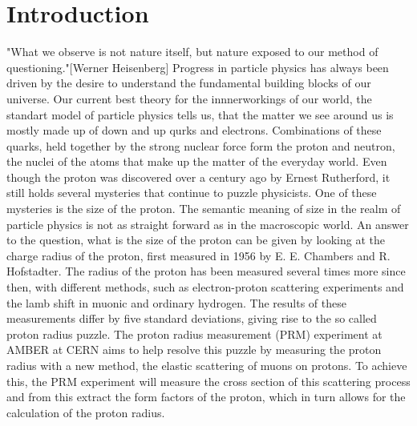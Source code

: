 \chapter{Introduction} \label{chap:introduction}
"What we observe is not nature itself, but nature exposed to our method of questioning."[Werner Heisenberg]\autocite{Heisenberg1958}
\newline
Progress in particle physics has always been driven by the desire to understand the fundamental building blocks of our universe.
\newline Our current best theory for the innnerworkings of our world,
the standart model of particle physics tells us, that the matter we see around us is mostly made up of down and up qurks and electrons.
Combinations of these quarks, held together by the strong nuclear force form the proton and neutron, the nuclei of the atoms that make up the matter of the everyday world.\autocite{Workman:2836514}
Even though the proton was discovered over a century ago by Ernest Rutherford\autocite{discoveryProton}, it still holds several mysteries that continue to puzzle physicists.
One of these mysteries is the size of the proton.
\newline
The semantic meaning of size in the realm of particle physics is not as straight forward as in the macroscopic world. An answer to the question,
what is the size of the proton can be given by looking at the charge radius of the proton, first measured in 1956 by E. E. Chambers and R. Hofstadter.\autocite{Hofstadter1956}
\newline
The radius of the proton has been measured several times more since then, with different methods, such as electron-proton scattering experiments and the lamb shift in muonic and ordinary hydrogen.
The results of these measurements differ by five standard deviations, giving rise to the so called proton radius puzzle.\autocite{ProposalAmber}
\newline
The proton radius measurement (PRM) experiment at AMBER at CERN aims to help resolve this puzzle by measuring the proton radius with a new method,
 the elastic scattering of muons on protons.
\newline
To achieve this, the PRM experiment will measure the cross section of this scattering process and from this extract the form factors of the proton, which in turn allows for the calculation of the proton radius.
